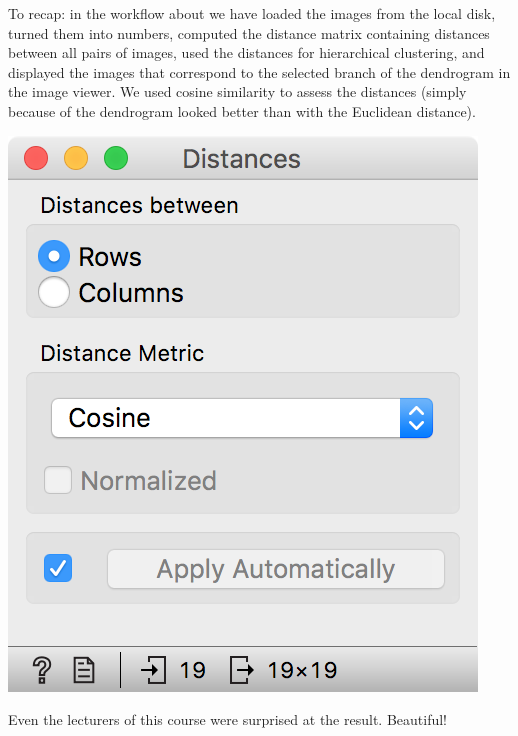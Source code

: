 To recap: in the workflow about we have loaded the images from the local disk, turned them into numbers, computed the distance matrix containing distances between all pairs of images, used the distances for hierarchical clustering, and displayed the images that correspond to the selected branch of the dendrogram in the image viewer. We used cosine similarity to assess the distances (simply because of the dendrogram looked better than with the Euclidean distance).

\begin{marginfigure}
    \centering
    \includegraphics[scale=0.6]{distances.png}
    \caption{$\;$}
\end{marginfigure}

\newpage

Even the lecturers of this course were surprised at the result. Beautiful!

